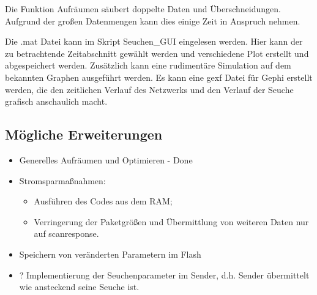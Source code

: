 \documentclass[11pt,ngerman]{scrartcl} %
\begin{document}
Die Funktion Aufräumen säubert doppelte Daten und Überschneidungen. Aufgrund der großen Datenmengen kann dies einige Zeit in Anspruch nehmen.

Die .mat Datei kann im Skript Seuchen\_GUI eingelesen werden. Hier kann der zu betrachtende Zeitabschnitt gewählt werden und verschiedene Plot erstellt und abgespeichert werden. Zusätzlich kann eine rudimentäre Simulation auf dem bekannten Graphen ausgeführt werden.
Es kann eine gexf Datei für Gephi erstellt werden, die den zeitlichen Verlauf des Netzwerks und den Verlauf der Seuche grafisch anschaulich macht.


\subsection{Mögliche Erweiterungen}
\begin{itemize}
\item  Generelles Aufräumen und Optimieren - Done
\item  Stromsparmaßnahmen: 
\begin{itemize}
\item 	Ausführen des Codes aus dem RAM; 
\item Verringerung der Paketgrößen und Übermittlung von weiteren Daten nur auf scanresponse. 
\end{itemize} 
\item  Speichern von veränderten Parametern im Flash
\item  ? Implementierung der Seuchenparameter im Sender, d.h. Sender übermittelt wie ansteckend seine Seuche ist.
\end{itemize}
\end{document}
